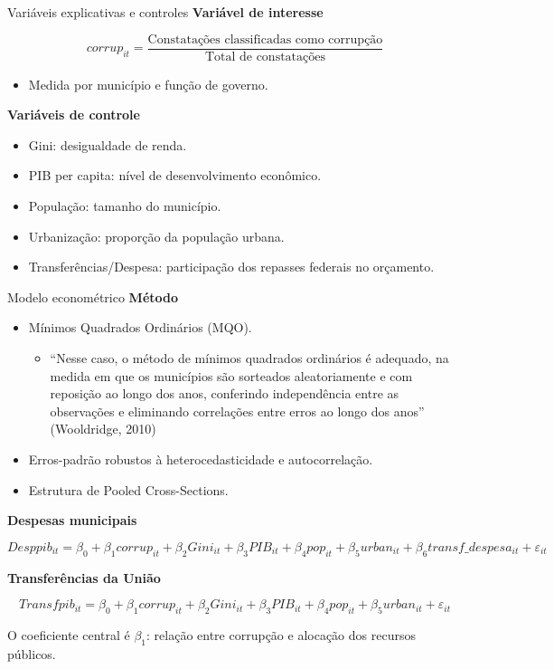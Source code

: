 \documentclass[
  10pt,
  ignorenonframetext,
  aspectratio=169,
  brazilian,
]{beamer}
\providecommand{\tightlist}{%
  \setlength{\itemsep}{0pt}\setlength{\parskip}{0pt}}
\begin{document}
\begin{frame}{Variáveis explicativas e controles}
\protect{}\label{variuxe1veis-explicativas-e-controles}
\textbf{Variável de interesse}

\[
corrup_{it}=
\frac{\text{Constatações classificadas como corrupção}}
{\text{Total de constatações}}
\]

\begin{itemize}
\tightlist
\item
  Medida por município e função de governo.
\end{itemize}

\textbf{Variáveis de controle}

\begin{itemize}
\tightlist
\item
  Gini: desigualdade de renda.
\item
  PIB per capita: nível de desenvolvimento econômico.
\item
  População: tamanho do município.
\item
  Urbanização: proporção da população urbana.
\item
  Transferências/Despesa: participação dos repasses federais no
  orçamento.
\end{itemize}
\end{frame}

\begin{frame}{Modelo econométrico}
\protect{}\label{modelo-economuxe9trico}
\textbf{Método}

\begin{itemize}
\tightlist
\item
  Mínimos Quadrados Ordinários (MQO).

  \begin{itemize}
  \tightlist
  \item
    ``Nesse caso, o método de mínimos quadrados ordinários é adequado,
    na medida em que os municípios são sorteados aleatoriamente e com
    reposição ao longo dos anos, conferindo independência entre as
    observações e eliminando correlações entre erros ao longo dos anos''
    (Wooldridge, 2010)
  \end{itemize}
\item
  Erros-padrão robustos à heterocedasticidade e autocorrelação.
\item
  Estrutura de Pooled Cross-Sections.
\end{itemize}

\textbf{Despesas municipais}

\[
Desppib_{it}=
\beta_0+\beta_1corrup_{it}
+\beta_2Gini_{it}
+\beta_3PIB_{it}
+\beta_4pop_{it}
+\beta_5urban_{it}
+\beta_6transf\_despesa_{it}
+\varepsilon_{it}
\]

\textbf{Transferências da União}

\[
Transfpib_{it}=
\beta_0+\beta_1corrup_{it}
+\beta_2Gini_{it}
+\beta_3PIB_{it}
+\beta_4pop_{it}
+\beta_5urban_{it}
+\varepsilon_{it}
\]

O coeficiente central é \(\beta_1\): relação entre corrupção e alocação
dos recursos públicos.
\end{frame}
\end{document}

